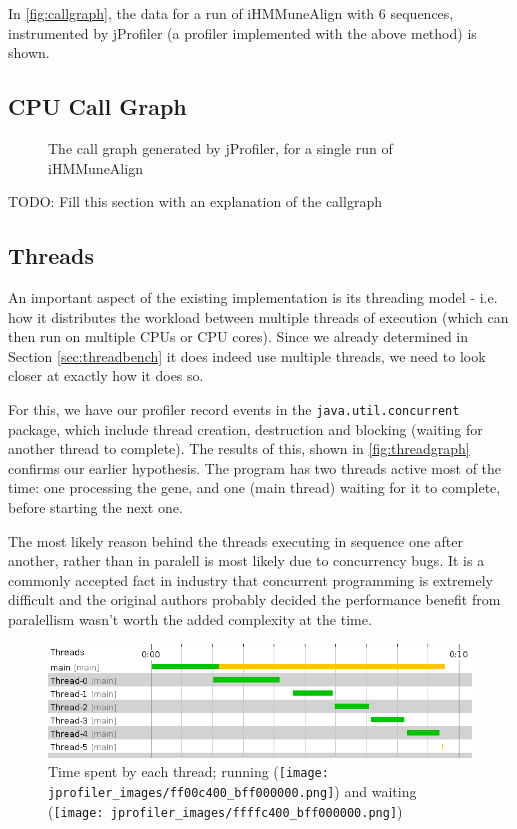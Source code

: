 \documentclass[a4paper,12pt]{report}
\begin{document}
In \autoref{fig:callgraph}, the data for a run of iHMMuneAlign with 6 sequences, instrumented by jProfiler (a profiler implemented with the above method) is shown.

\subsection{CPU Call Graph}
\begin{figure}
 \caption{The call graph generated by jProfiler, for a single run of iHMMuneAlign}
 \label{fig:callgraph}
\end{figure}
TODO: Fill this section with an explanation of the callgraph

\subsection{Threads}
\label{sec:threadprof}
An important aspect of the existing implementation is its threading model - i.e. how it distributes the workload between multiple threads of execution (which can then run on multiple CPUs or CPU cores). Since we already determined in Section \ref{sec:threadbench} it does indeed use multiple threads, we need to look closer at exactly how it does so. 

For this, we have our profiler record events in the \texttt{java.util.concurrent} package, which include thread creation, destruction and blocking (waiting for another thread to complete). The results of this, shown in \autoref{fig:threadgraph} confirms our earlier hypothesis. The program has two threads active most of the time: one processing the gene, and one (main thread) waiting for it to complete, before starting the next one.

The most likely reason behind the threads executing in sequence one after another, rather than in paralell is most likely due to concurrency bugs. It is a commonly accepted fact in industry that concurrent programming is extremely difficult and the original authors probably decided the performance benefit from paralellism wasn't worth the added complexity at the time.

\begin{figure}
  \centering
  \includegraphics[width=\textwidth]{threads-graph.png}
  \caption{Time spent by each thread;
  running (\protect\texttt{[image: jprofiler\_images/ff00c400\_bff000000.png]}) and
  waiting (\protect\texttt{[image: jprofiler\_images/ffffc400\_bff000000.png]})}
  \label{fig:threadgraph}
\end{figure}
\end{document}

